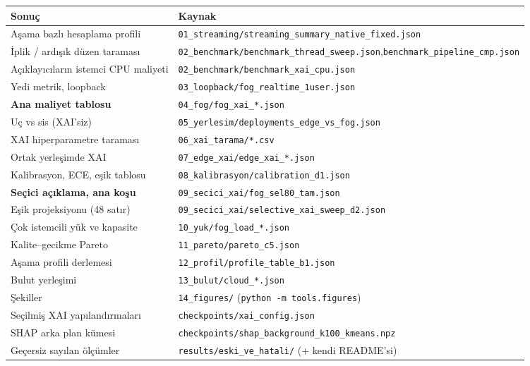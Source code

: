 \documentclass[11pt,a4paper]{article}
\newcommand{\kod}[1]{\texttt{\small #1}}
\newcommand{\dosya}[1]{\texttt{\footnotesize #1}}
\begin{document}
\begin{table}[H]
\centering\footnotesize
\begin{tabular}{@{}p{6.1cm}p{8.5cm}@{}}
\toprule
\textbf{Sonuç} & \textbf{Kaynak} \\
\midrule
Aşama bazlı hesaplama profili & \dosya{01\_streaming/streaming\_summary\_native\_fixed.json} \\
İplik / ardışık düzen taraması & \dosya{02\_benchmark/benchmark\_thread\_sweep.json},\newline \dosya{benchmark\_pipeline\_cmp.json} \\
Açıklayıcıların istemci CPU maliyeti & \dosya{02\_benchmark/benchmark\_xai\_cpu.json} \\
Yedi metrik, loopback & \dosya{03\_loopback/fog\_realtime\_1user.json} \\
\textbf{Ana maliyet tablosu} & \dosya{04\_fog/fog\_xai\_*.json} \\
Uç vs sis (XAI'siz) & \dosya{05\_yerlesim/deployments\_edge\_vs\_fog.json} \\
XAI hiperparametre taraması & \dosya{06\_xai\_tarama/*.csv} \\
Ortak yerleşimde XAI & \dosya{07\_edge\_xai/edge\_xai\_*.json} \\
Kalibrasyon, ECE, eşik tablosu & \dosya{08\_kalibrasyon/calibration\_d1.json} \\
\textbf{Seçici açıklama, ana koşu} & \dosya{09\_secici\_xai/fog\_sel80\_tam.json} \\
Eşik projeksiyonu (48 satır) & \dosya{09\_secici\_xai/selective\_xai\_sweep\_d2.json} \\
Çok istemcili yük ve kapasite & \dosya{10\_yuk/fog\_load\_*.json} \\
Kalite--gecikme Pareto & \dosya{11\_pareto/pareto\_c5.json} \\
Aşama profili derlemesi & \dosya{12\_profil/profile\_table\_b1.json} \\
Bulut yerleşimi & \dosya{13\_bulut/cloud\_*.json} \\
Şekiller & \dosya{14\_figures/} (\kod{python -m tools.figures}) \\
Seçilmiş XAI yapılandırmaları & \dosya{checkpoints/xai\_config.json} \\
SHAP arka plan kümesi & \dosya{checkpoints/shap\_background\_k100\_kmeans.npz} \\
Geçersiz sayılan ölçümler & \dosya{results/eski\_ve\_hatali/} (+ kendi README'si) \\
\bottomrule
\end{tabular}
\end{table}
\end{document}
